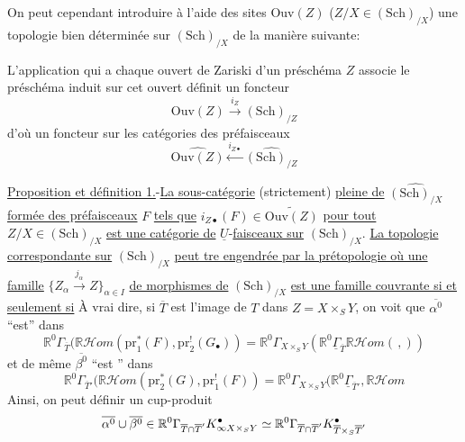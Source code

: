 On peut cependant introduire à l'aide des sites $\mathrm{Ouv}(Z)$ ($Z/X\in(\mathrm{Sch})_{/X}$) une topologie bien déterminée sur $(\mathrm{Sch})_{/X}$ de la manière suivante:

L'application qui a chaque ouvert de Zariski d'un préschéma $Z$ associe le préschéma induit sur cet ouvert définit un foncteur
\[
\mathrm{Ouv}(Z)\xrightarrow{i_Z}(\mathrm{Sch})_{/Z}
\]
d'où un foncteur sur les catégories des préfaisceaux
\[
\widehat{\mathrm{Ouv}(Z)}\xleftarrow{i_{Z\bullet}}\widehat{(\mathrm{Sch})_{/Z}}
\]

\uline{Proposition et définition 1.}-\uline{La sous-catégorie} (strictement) \uline{pleine de} $\widehat{(\mathrm{Sch})_{/X}}$ \uline{formée des préfaisceaux} $F$ \uline{tels que} $i_{Z\bullet}(F)\in\widetilde{\mathrm{Ouv}(Z)}$ \uline{pour tout} $Z/X\in(\mathrm{Sch})_{/X}$ \uline{est une catégorie de} $\underline{U}$-\uline{faisceaux sur} $(\mathrm{Sch})_{/X}$.  \uline{La topologie correspondante sur} $(\mathrm{Sch})_{/X}$ \uline{peut tre engendrée par la prétopologie où une famille} $\{Z_\alpha\xrightarrow{j_\alpha}Z\}_{\alpha\in I}$ \uline{de morphismes de} $(\mathrm{Sch})_{/X}$ \uline{est une famille couvrante si et seulement si}
À vrai dire,  si $\overline{T}$ est l'image de $T$ dans $Z=X\times_S Y$, on voit que $\overline{\alpha^0}$ ``est'' dans 
\[
\mathbb{R}^0\Gamma_{\overline{T}}(\mathbb{R}\mathcal{H}om(\mathrm{pr}_1^*(F),\mathrm{pr}_2^!(G_\bullet))
=\mathbb{R}^0\Gamma_{X\times_S Y}(\mathbb{R}^0\underline{\Gamma}_{\overline{T}}\mathbb{R}\mathcal{H}om(\,,))
\]
et de même $\overline{\beta^0}$ ``est '' dans
\[
\mathbb{R}^0\Gamma_{\overline{T}'}(\mathbb{R}\mathcal{H}om(\mathrm{pr}_2^*(G),\mathrm{pr}_1^!(F))
=\mathbb{R}^0\Gamma_{X\times_S Y}(\mathbb{R}^0\underline{\Gamma}_{\overline{T}'},\mathbb{R}\mathcal{H}om
\]
Ainsi, on peut définir un cup-produit
\[
\overline{\alpha^0}\cup\overline{\beta^0}\in
\mathbb{R}^0\Gamma_{\overline{T}\cap\overline{T}'}K_{{\infty}X\times_S Y}^{\bullet}
\simeq\mathbb{R}^0\Gamma_{\overline{T}\cap\overline{T}'}K_{\overline{T}\times_S\overline{T}'}^{\bullet}
\]
